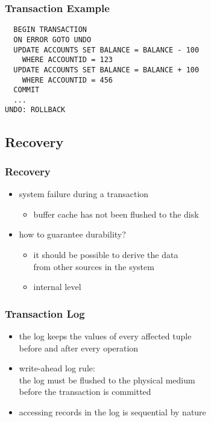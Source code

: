 \documentclass[dvipsnames]{beamer}
\theoremstyle{plain}
\begin{document}
\begin{frame}[fragile]
  \frametitle{Transaction Example}

  \begin{example}
    \begin{lstlisting}
  BEGIN TRANSACTION
  ON ERROR GOTO UNDO
  UPDATE ACCOUNTS SET BALANCE = BALANCE - 100
    WHERE ACCOUNTID = 123
  UPDATE ACCOUNTS SET BALANCE = BALANCE + 100
    WHERE ACCOUNTID = 456
  COMMIT
  ...
UNDO: ROLLBACK
    \end{lstlisting}
  \end{example}
\end{frame}

\subsection{Recovery}

\begin{frame}
  \frametitle{Recovery}

  \begin{itemize}
    \item system failure during a transaction
    \begin{itemize}
      \item buffer cache has not been flushed to the disk
    \end{itemize}

    \pause
    \item how to guarantee durability?
    \begin{itemize}
      \item it should be possible to derive the data\\
	from other sources in the system
      \item internal level
    \end{itemize}
  \end{itemize}
\end{frame}

\begin{frame}
  \frametitle{Transaction Log}

  \begin{itemize}
    \item the \alert{log} keeps the values of every affected tuple\\
      before and after every operation

    \pause
    \medskip
    \item \alert{write-ahead log rule}:\\
      the log must be flushed to the physical medium\\
      before the transaction is committed

    \pause
    \medskip
    \item accessing records in the log is sequential by nature
  \end{itemize}
\end{frame}
\end{document}
